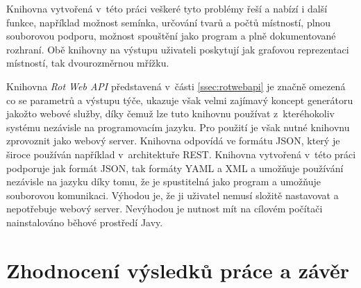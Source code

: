 Knihovna vytvořená v~této práci veškeré tyto problémy řeší a nabízí i další funkce, například možnost semínka, určování tvarů a počtů místností, plnou souborovou podporu, možnost spouštění jako program a plně dokumentované rozhraní.
Obě knihovny na výstupu uživateli poskytují jak grafovou reprezentaci místností, tak dvourozměrnou mřížku.
\par
Knihovna \textit{Rot Web API} představená v~části \ref{ssec:rotwebapi} je značně omezená co se parametrů a výstupu týče, ukazuje však velmi zajímavý koncept generátoru jakožto webové služby, díky čemuž lze tuto knihovnu používat z~kteréhokoliv systému nezávisle na programovacím jazyku.
Pro použití je však nutné knihovnu zprovoznit jako webový server.
Knihovna odpovídá ve formátu JSON, který je široce používán například v~architektuře REST.
Knihovna vytvořená v~této práci podporuje jak formát JSON, tak formáty YAML a XML a umožňuje používání nezávisle na jazyku díky tomu, že je spustitelná jako program a umožňuje souborovou komunikaci.
Výhodou je, že ji uživatel nemusí složitě nastavovat a nepotřebuje webový server.
Nevýhodou je nutnost mít na cílovém počítači nainstalováno běhové prostředí Javy.


\chapter{Zhodnocení výsledků práce a závěr}
\label{ch:zaver} %


